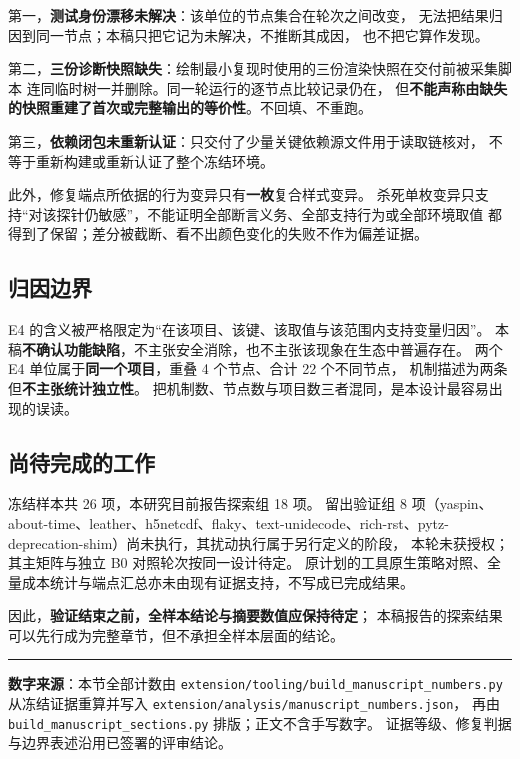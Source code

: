 \documentclass[11pt]{ctexart}
\begin{document}
第一，\textbf{测试身份漂移未解决}：该单位的节点集合在轮次之间改变，
无法把结果归因到同一节点；本稿只把它记为未解决，不推断其成因，
也不把它算作发现。

第二，\textbf{三份诊断快照缺失}：绘制最小复现时使用的三份渲染快照在交付前被采集脚本
连同临时树一并删除。同一轮运行的逐节点比较记录仍在，
但\textbf{不能声称由缺失的快照重建了首次或完整输出的等价性}。不回填、不重跑。

第三，\textbf{依赖闭包未重新认证}：只交付了少量关键依赖源文件用于读取链核对，
不等于重新构建或重新认证了整个冻结环境。

此外，修复端点所依据的行为变异只有\textbf{一枚}复合样式变异。
杀死单枚变异只支持“对该探针仍敏感”，不能证明全部断言义务、全部支持行为或全部环境取值
都得到了保留；差分被截断、看不出颜色变化的失败不作为偏差证据。

\subsection{归因边界}

E4 的含义被严格限定为“在该项目、该键、该取值与该范围内支持变量归因”。
本稿\textbf{不确认功能缺陷}，不主张安全消除，也不主张该现象在生态中普遍存在。
两个 E4 单位属于\textbf{同一个项目}，重叠 4 个节点、合计 22 个不同节点，
机制描述为两条但\textbf{不主张统计独立性}。
把机制数、节点数与项目数三者混同，是本设计最容易出现的误读。

\subsection{尚待完成的工作}

冻结样本共 26 项，本研究目前报告探索组 18 项。
留出验证组 8 项（yaspin、about-time、leather、h5netcdf、flaky、text-unidecode、rich-rst、pytz-deprecation-shim）尚未执行，其扰动执行属于另行定义的阶段，
本轮未获授权；其主矩阵与独立 B0 对照轮次按同一设计待定。
原计划的工具原生策略对照、全量成本统计与端点汇总亦未由现有证据支持，不写成已完成结果。

因此，\textbf{验证结束之前，全样本结论与摘要数值应保持待定}；
本稿报告的探索结果可以先行成为完整章节，但不承担全样本层面的结论。

\bigskip
\noindent\rule{\linewidth}{0.4pt}

\smallskip
\noindent\small
\textbf{数字来源}：本节全部计数由 \texttt{extension/tooling/build\_manuscript\_numbers.py}
从冻结证据重算并写入 \texttt{extension/analysis/manuscript\_numbers.json}，
再由 \texttt{build\_manuscript\_sections.py} 排版；正文不含手写数字。
证据等级、修复判据与边界表述沿用已签署的评审结论。
\end{document}
